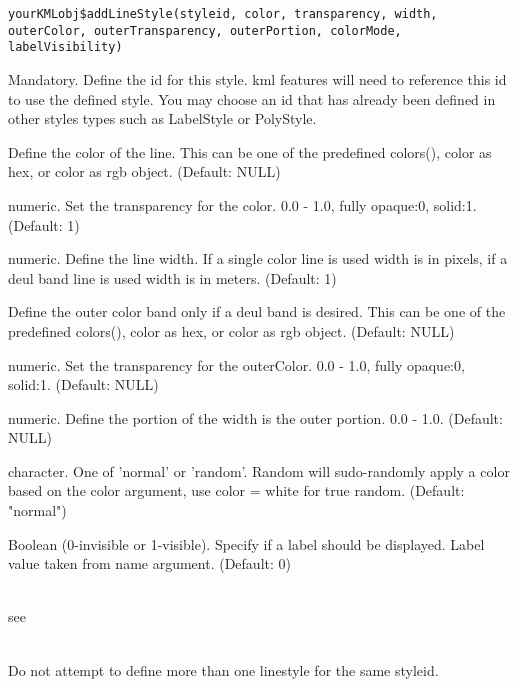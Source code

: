 \documentclass[a4paper]{book}
\begin{document}
%
\begin{Usage}
\begin{verbatim}
yourKMLobj$addLineStyle(styleid, color, transparency, width, outerColor, outerTransparency, outerPortion, colorMode, labelVisibility)
\end{verbatim}
\end{Usage}
%
\begin{Arguments}
\begin{ldescription}

\item[\code{styleid}] 
Mandatory. Define the id for this style. kml features will need to reference this id to use the defined style. You may choose an id that has already been defined in other styles types such as LabelStyle or PolyStyle.



\item[\code{color}] Define the color of the line. This can be one of the predefined colors(), color as hex, or color as rgb object. (Default: NULL)
\item[\code{transparency}] numeric. Set the transparency for the color. 0.0 - 1.0, fully opaque:0, solid:1. (Default: 1)
\item[\code{width}] numeric. Define the line width. If a single color line is used width is in pixels, if a deul band line is used width is in meters. (Default: 1)
\item[\code{outerColor}] Define the outer color band only if a deul band is desired. This can be one of the predefined colors(), color as hex, or color as rgb object. (Default: NULL)
\item[\code{outerTransparency}] numeric. Set the transparency for the outerColor. 0.0 - 1.0, fully opaque:0, solid:1. (Default: NULL)
\item[\code{outerPortion}] numeric. Define the portion of the width is the outer portion. 0.0 - 1.0. (Default: NULL)
\item[\code{colorMode}] character. One of 'normal' or 'random'. Random will sudo-randomly apply a color based on the color argument, use color = white for true random. (Default: "normal")
\item[\code{labelVisibility}] Boolean (0-invisible or 1-visible). Specify if a label should be displayed. Label value taken from name argument. (Default: 0)
\end{ldescription}
\end{Arguments}
%
\begin{Note}\relax
{}\\{}
see \\{}

\\{}
Do not attempt to define more than one linestyle for the same styleid.

\end{Note}
\end{document}
